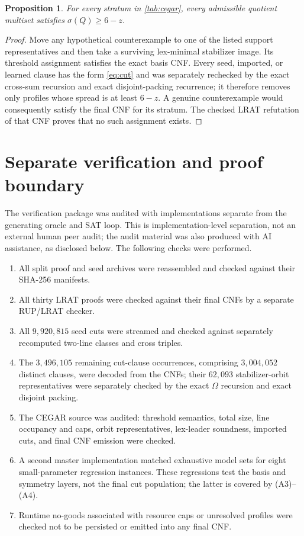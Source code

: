 \documentclass[11pt]{amsart}
\newtheorem{proposition}[theorem]{Proposition}
\theoremstyle{definition}
\newcommand{\Om}{\Omega}
\begin{document}
\begin{proposition}\label{prop:cegar}
For every stratum in \cref{tab:cegar}, every admissible quotient multiset satisfies $\sigma(Q)\geq6-z$.
\end{proposition}

\begin{proof}
Move any hypothetical counterexample to one of the listed support
representatives and then take a surviving lex-minimal stabilizer image.
Its threshold assignment satisfies the exact basis CNF.  Every seed,
imported, or learned clause has the form \eqref{eq:cut} and was
separately rechecked by the exact cross-sum recursion and exact
disjoint-packing recurrence; it therefore removes only profiles whose
spread is at least $6-z$.  A genuine counterexample would consequently
satisfy the final CNF for its stratum.  The checked LRAT refutation of
that CNF proves that no such assignment exists.
\end{proof}

\section{Separate verification and proof boundary}\label{sec:audit}

The verification package was audited with implementations separate from
the generating oracle and SAT loop.  This is implementation-level
separation, not an external human peer audit; the audit material was
also produced with AI assistance, as disclosed below.  The following
checks were performed.

\begin{enumerate}[label=(A\arabic*)]
\item All split proof and seed archives were reassembled and checked against their SHA-256 manifests.
\item All thirty LRAT proofs were checked against their final CNFs by a separate RUP/LRAT checker.
\item All $9{,}920{,}815$ seed cuts were streamed and checked against separately recomputed two-line classes and cross triples.
\item The $3{,}496{,}105$ remaining cut-clause occurrences, comprising
$3{,}004{,}052$ distinct clauses, were decoded from the CNFs; their
$62{,}093$ stabilizer-orbit representatives were separately checked by
the exact $\Om$ recursion and exact disjoint packing.
\item The CEGAR source was audited: threshold semantics, total size, line occupancy and caps, orbit representatives, lex-leader soundness, imported cuts, and final CNF emission were checked.
\item A second master implementation matched exhaustive model sets for
eight small-parameter regression instances.  These regressions test the
basis and symmetry layers, not the final cut population; the latter is
covered by (A3)--(A4).
\item Runtime no-goods associated with resource caps or unresolved
profiles were checked not to be persisted or emitted into any final CNF.
\end{enumerate}
\end{document}
